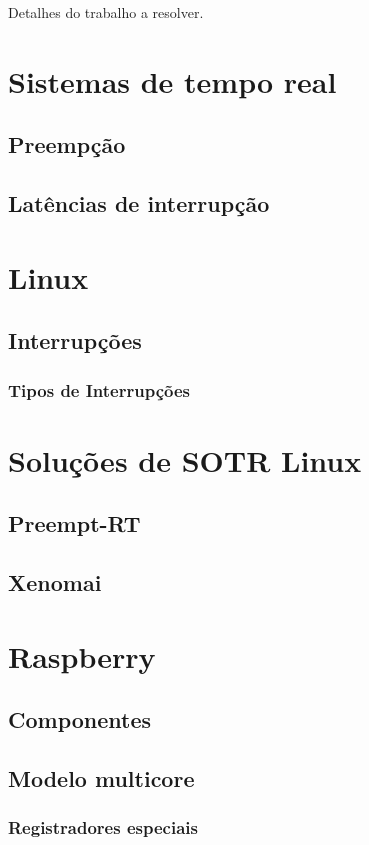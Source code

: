 
Detalhes do trabalho a resolver.

\section{Sistemas de tempo real}
\subsection{Preempção}
\subsection{Latências de interrupção}
\section{Linux}
\subsection{Interrupções}
\subsubsection{Tipos de Interrupções}
\section{Soluções de SOTR Linux}
\subsection{Preempt-RT}
\subsection{Xenomai}
\section{Raspberry}
\subsection{Componentes}
\subsection{Modelo multicore}
\subsubsection{Registradores especiais}
